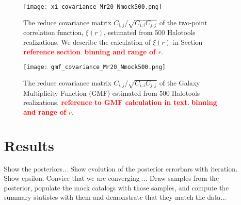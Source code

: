 \documentclass[12pt, preprint]{aastex}
\newcommand{\todo}[1]{{\bf \textcolor{red}{ #1}}}
\begin{document}


\begin{figure}
\texttt{[image: xi\_covariance\_Mr20\_Nmock500.png]}
\caption{The reduce covariance matrix $C_{i,j}/\sqrt{C_{i,i} C_{j,j}}$ of 
the two-point correlation function, $\xi(r)$, estimated from 500 Halotools 
realizations. We describe the calculation of $\xi(r)$ in Section \todo{reference section}. \todo{binning and range of $r$}.}
\label{fig:2pcf_cov}
\end{figure}
\begin{figure}
  \texttt{[image: gmf\_covariance\_Mr20\_Nmock500.png]}
\caption{The reduce covariance matrix $C_{i,j}/\sqrt{C_{i,i} C_{j,j}}$ of 
the Galaxy Multiplicity Function (GMF) estimated from 500 Halotools 
realizations. \todo{reference to GMF calculation in text}. 
\todo{binning and range of $r$}.}
\label{fig:gmf_cov}
\end{figure}

\section{Results}\label{sec:results}
Show the posteriors...
Show evolution of the posterior errorbars with iteration. Show epsilon. Convice that we are converging ...
Draw samples from the posterior, populate the mock catalogs with those samples, and compute the summary statistcs with them 
and demonstrate that they match the data...
\end{document}
